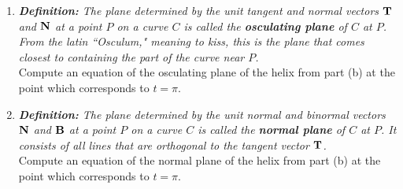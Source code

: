 \documentclass[12pt]{article}
\newif\ifans
\begin{document}
\begin{enumerate}
\begin{enumerate}
\ifans{\fbox{\parbox{1\linewidth}{${\bf T}(t)=\left\langle -\frac{2}{\sqrt{5}}\sin{t}, \frac{1}{\sqrt{5}}, \frac{2}{\sqrt{5}}\cos{t}\right\rangle$; ${\bf N}(t)=\left\langle -\cos{t}, 0, -\sin{t}\right\rangle$; \\
${\bf B}(t)=\left\langle -\frac{1}{\sqrt{5}}\sin{t}, -\frac{2}{\sqrt{5}}, \frac{1}{\sqrt{5}}\cos{t}\right\rangle$\\
}}} \fi

\item  \emph{{\bf Definition:} The plane determined by the unit tangent and normal vectors ${\bf T}$ and ${\bf N}$ at a point $P$ on a curve $C$ is called the {\bf osculating plane} of $C$ at $P$.  From the latin ``Osculum," meaning to kiss, this is the plane that comes closest to containing the part of the curve near $P$.}\\

Compute an equation of the osculating plane of the helix from part (b) at the point which corresponds to $t=\pi$.\\

\ifans{\fbox{$2y+z=2\pi$}} \fi

\item \emph{{\bf Definition:} The plane determined by the unit normal and binormal vectors ${\bf N}$ and ${\bf B}$ at a point $P$ on a curve $C$ is called the {\bf normal plane} of $C$ at $P$.  It consists of all lines that are orthogonal to the tangent vector ${\bf T}$.}\\

Compute an equation of the normal plane of the helix from part (b) at the point which corresponds to $t=\pi$. \\

\ifans{\fbox{$y-2z=\pi$}} \fi

\end{enumerate}

\end{enumerate}
\end{document}
